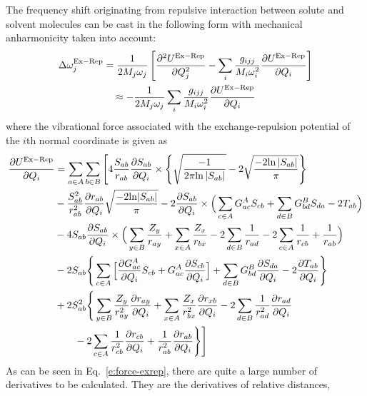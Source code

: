 \documentclass[b5paper,oneside,fleqn,11pt]{book}
\newcommand{\fderiv}[2]{\ensuremath{
    \frac{\partial #1}{\partial #2}}}
\newcommand{\sderiv}[2]{\ensuremath{
    \frac{\partial^2 #1}{\partial #2^2}
    }}
\begin{document}
\begin{refsection}
The frequency shift originating from repulsive interaction between 
solute and sol\-vent molecules can be cast in the following form 
with mechanical anharmonicity taken into account: 
%
\begin{multline}\label{e:dw-exrep-base}
\Delta \omega_j^{\rm Ex-Rep} =
\frac{1}{2M_j\omega_j} \left[ 
\sderiv{U^{\rm Ex-Rep}}{Q_j} -
\sum_i \frac{g_{ijj}}{M_i\omega_i^2}\fderiv{U^{\rm Ex-Rep}}{Q_i}
\right]
\\\approx 
-\frac{1}{2M_j\omega_j}\sum_i \frac{g_{ijj}}{M_i\omega_i^2}\fderiv{U^{\rm Ex-Rep}}{Q_i}
\end{multline}
%
where the vibrational force associated with the exchange\hyp{}repulsion 
potential of the $i$th normal coordinate is given as
%
\begin{align}\label{e:force-exrep}
\fderiv{U^{\rm Ex-Rep}}{Q_i} &= 
\sum_{a \in A}\sum_{b \in B} 
\Bigg[ 4
   \frac{S_{ab}}{r_{ab}}
   \fderiv{S_{ab}}{Q_i}
   \times
   \Bigg\{
       \sqrt{\frac{-1}{2\pi{\rm ln}\left|S_{ab}\right|}} - 2\sqrt{\frac{-2{\rm ln}\left|S_{ab}\right|}{\pi}}
   \Bigg\} \nonumber \\
   &-\frac{S_{ab}^2}{r_{ab}^2}
   \fderiv{r_{ab}}{Q_i}
   \sqrt{\frac{-2{\rm ln}|S_{ab}|}{\pi}}
   - 2\fderiv{S_{ab}}{Q_i} 
   \times
   \Big( 
       \sum_{c \in A} G^A_{ac} S_{cb} + 
       \sum_{d \in B} G^B_{bd} S_{da} - 2 T_{ab} 
   \Big) \nonumber \\
   &-4S_{ab} \fderiv{S_{ab}}{Q_i}
   \times
   \Big( \sum_{y \in B} \frac{Z_y}{r_{ay}} 
       + \sum_{x \in A} \frac{Z_x}{r_{bx}} - 2\sum_{d \in B} \frac{1}{r_{ad}}
       - 2\sum_{c \in A} \frac{1}{r_{cb}} + \frac{1}{r_{ab}}
   \Big) \nonumber \\%
   &- 2S_{ab}
   \Bigg\{ 
       \sum_{c \in A} 
       \Big[
          \fderiv{G^A_{ac}}{Q_i} S_{cb}  +  G^A_{ac} \fderiv{S_{cb}}{Q_i}
       \Big] +
       \sum_{d \in B} G^B_{bd} \fderiv{S_{da}}{Q_i} - 2 \fderiv{T_{ab}}{Q_i}
   \Bigg\} \nonumber \\
   &+ 2S^2_{ab} 
   \Bigg\{ 
      \sum_{y \in B} \frac{Z_y}{r_{ay}^2} \fderiv{r_{ay}}{Q_i} +
      \sum_{x \in A} \frac{Z_x}{r_{bx}^2} \fderiv{r_{xb}}{Q_i} -
      2\sum_{d \in B} \frac{1}{r_{ad}^2} \fderiv{r_{ad}}{Q_i} \nonumber \\
    &\qquad- 2\sum_{c \in A} \frac{1}{r_{cb}^2} \fderiv{r_{cb}}{Q_i} + \frac{1}{r_{ab}^2} \fderiv{r_{ab}}{Q_i}
   \Bigg\}
\Bigg]
\end{align}
%
As can be seen in Eq.~\eqref{e:force-exrep}, there are quite a large number of derivatives 
to be calculated. They are the derivatives of relative distances, 

\end{refsection}
\end{document}
